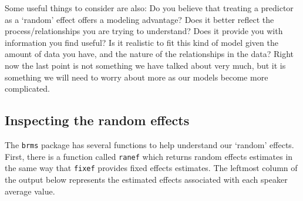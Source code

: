 \documentclass[
]{book}
\newenvironment{Shaded}{\begin{snugshade}}{\end{snugshade}}
\newcommand{\CommentTok}[1]{\textcolor[rgb]{0.56,0.35,0.01}{\textit{#1}}}
\newcommand{\DecValTok}[1]{\textcolor[rgb]{0.00,0.00,0.81}{#1}}
\newcommand{\DocumentationTok}[1]{\textcolor[rgb]{0.56,0.35,0.01}{\textbf{\textit{#1}}}}
\newcommand{\FunctionTok}[1]{\textcolor[rgb]{0.00,0.00,0.00}{#1}}
\newcommand{\NormalTok}[1]{#1}
\newcommand{\OtherTok}[1]{\textcolor[rgb]{0.56,0.35,0.01}{#1}}
\newcommand{\SpecialCharTok}[1]{\textcolor[rgb]{0.00,0.00,0.00}{#1}}
\newcommand{\StringTok}[1]{\textcolor[rgb]{0.31,0.60,0.02}{#1}}
\begin{document}
Some useful things to consider are also: Do you believe that treating a predictor as a `random' effect offers a modeling advantage? Does it better reflect the process/relationships you are trying to understand? Does it provide you with information you find useful? Is it realistic to fit this kind of model given the amount of data you have, and the nature of the relationships in the data? Right now the last point is not something we have talked about very much, but it is something we will need to worry about more as our models become more complicated.

\hypertarget{inspecting-the-random-effects}{%
\subsection{Inspecting the random effects}\label{inspecting-the-random-effects}}

The \texttt{brms} package has several functions to help understand our `random' effects. First, there is a function called \texttt{ranef} which returns random effects estimates in the same way that \texttt{fixef} provides fixed effects estimates. The leftmost column of the output below represents the estimated effects associated with each speaker average value.

\begin{Shaded}
\end{Shaded}
\end{document}
